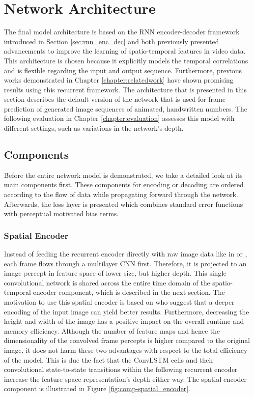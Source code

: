 \section{Network Architecture}

The final model architecture is based on the RNN encoder-decoder framework introduced in Section \ref{sec:rnn_enc_dec} and both previously presented advancements to improve the learning of spatio-temporal features in video data. This architecture is chosen because it explicitly models the temporal correlations and is flexible regarding the input and output sequence. Furthermore, previous works demonstrated in Chapter \ref{chapter:relatedwork} have shown promising results using this recurrent framework. The architecture that is presented in this section describes the default version of the network that is used for frame prediction of generated image sequences of animated, handwritten numbers. The following evaluation in Chapter \ref{chapter:evaluation} assesses this model with different settings, such as variations in the network's depth.

\subsection{Components} \label{sec:impl-components}

Before the entire network model is demonstrated, we take a detailed look at its main components first. These components for encoding or decoding are ordered according to the flow of data while propagating forward through the network. Afterwards, the loss layer is presented which combines standard error functions with perceptual motivated bias terms.

\subsubsection{Spatial Encoder}

Instead of feeding the recurrent encoder directly with raw image data like in \parencite{unsup_learn_lstm} or \parencite{conv_lstm_nowcasting}, each frame flows through a multilayer CNN first. Therefore, it is projected to an image percept in feature space of lower size, but higher depth. This single convolutional network is shared across the entire time domain of the spatio-temporal encoder component, which is described in the next section. The motivation to use this spatial encoder is based on \parencite{spat_temp_video_autoenc} who suggest that a deeper encoding of the input image can yield better results. Furthermore, decreasing the height and width of the image has a positive impact on the overall runtime and memory efficiency. Although the number of feature maps and hence the dimensionality of the convolved frame percepts is higher compared to the original image, it does not harm these two advantages with respect to the total efficiency of the model. This is due the fact that the ConvLSTM cells and their convolutional state-to-state transitions within the following recurrent encoder increase the feature space representation's depth either way. The spatial encoder component is illustrated in Figure \ref{fig:comp-spatial_encoder}.






